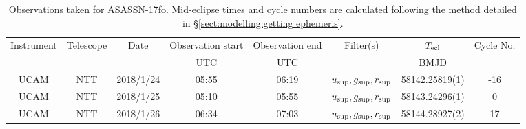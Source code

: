 \begin{table}
	\begin{center}
		\caption{Observations taken for ASASSN-17fo. Mid-eclipse times and cycle numbers are calculated following the method detailed in \S\ref{sect:modelling:getting ephemeris}.}
		\label{table:observing:observation logs ASASSN-17fo}
		\begin{tabular}{cccccccc}
			\hline
			Instrument & Telescope & Date & Observation start & Observation end & Filter(s) & $T_{\rm ecl}$ & Cycle No. \\
			 &  &  & UTC & UTC &  & BMJD &  \\
			\hline
			\hline
			UCAM & NTT & 2018/1/24 & 05:55 & 06:19 & $u_{\rm sup},g_{\rm sup},r_{\rm sup}$ & 58142.25819(1)                                                                                                            &                                         -16 \\
			UCAM & NTT & 2018/1/25 & 05:10 & 05:55 & $u_{\rm sup},g_{\rm sup},r_{\rm sup}$ & 58143.24296(1)                                                                                                            &                                           0 \\
			UCAM & NTT & 2018/1/26 & 06:34 & 07:03 & $u_{\rm sup},g_{\rm sup},r_{\rm sup}$ & 58144.28927(2)                                                                                                            &                                          17 \\
		   \hline
		\end{tabular}
	\end{center}
\end{table}